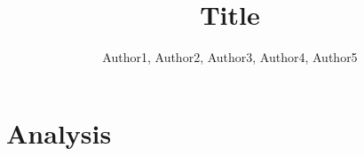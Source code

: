 \documentclass[letterpaper,twocolumn,10pt]{article}
\begin{document}
\date{}


\title{Title}

\author{
    Author1, 
    Author2, 
    Author3,
    Author4,
    Author5
} %


\maketitle



\section{Analysis}






\end{document}
